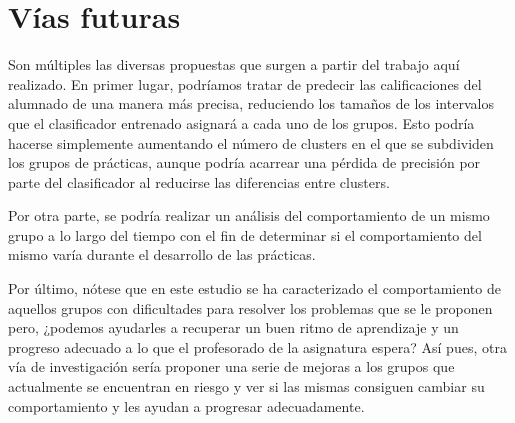 \chapter{Vías futuras}\label{sec:chapterXV}

Son múltiples las diversas propuestas que surgen a partir del trabajo aquí realizado. En primer lugar, podríamos tratar de predecir las calificaciones del alumnado de una manera más precisa, reduciendo los tamaños de los intervalos que el clasificador entrenado asignará a cada uno de los grupos. Esto podría hacerse simplemente aumentando el número de clusters en el que se subdividen los grupos de prácticas, aunque podría acarrear una pérdida de precisión por parte del clasificador al reducirse las diferencias entre clusters.

Por otra parte, se podría realizar un análisis del comportamiento de un mismo grupo a lo largo del tiempo con el fin de determinar si el comportamiento del mismo varía durante el desarrollo de las prácticas.

Por último, nótese que en este estudio se ha caracterizado el comportamiento de aquellos grupos con dificultades para resolver los problemas que se le proponen pero, ¿podemos ayudarles a recuperar un buen ritmo de aprendizaje y un progreso adecuado a lo que el profesorado de la asignatura espera? Así pues, otra vía de investigación sería proponer una serie de mejoras a los grupos que actualmente se encuentran en riesgo y ver si las mismas consiguen cambiar su comportamiento y les ayudan a progresar adecuadamente.